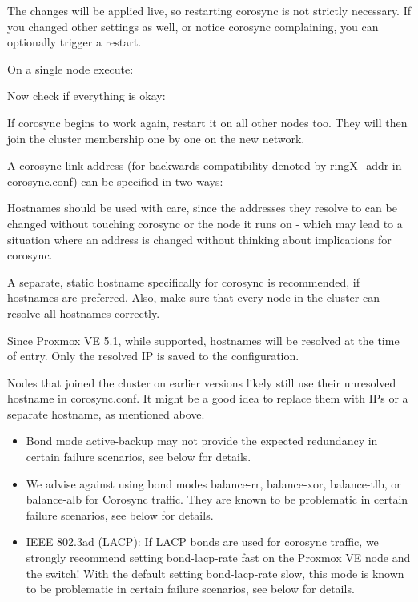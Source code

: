 The changes will be applied live, so restarting corosync is not strictly necessary. If you changed other settings as well, or notice corosync complaining, you can optionally trigger a restart.

On a single node execute:

Now check if everything is okay:

If corosync begins to work again, restart it on all other nodes too. They will then join the cluster membership one by one on the new network.

A corosync link address (for backwards compatibility denoted by ringX_addr in corosync.conf) can be specified in two ways:

Hostnames should be used with care, since the addresses they resolve to can be changed without touching corosync or the node it runs on - which may lead to a situation where an address is changed without thinking about implications for corosync.

A separate, static hostname specifically for corosync is recommended, if hostnames are preferred. Also, make sure that every node in the cluster can resolve all hostnames correctly.

Since Proxmox VE 5.1, while supported, hostnames will be resolved at the time of entry. Only the resolved IP is saved to the configuration.

Nodes that joined the cluster on earlier versions likely still use their unresolved hostname in corosync.conf. It might be a good idea to replace them with IPs or a separate hostname, as mentioned above.

\begin{itemize}[leftmargin=2cm]

	\item Bond mode active-backup may not provide the expected redundancy in certain failure scenarios, see below for details.

	\item We advise against using bond modes balance-rr, balance-xor, balance-tlb, or balance-alb for Corosync traffic. They are known to be problematic in certain failure scenarios, see below for details.

	\item IEEE 802.3ad (LACP): If LACP bonds are used for corosync traffic, we strongly recommend setting bond-lacp-rate fast on the Proxmox VE node and the switch! With the default setting bond-lacp-rate slow, this mode is known to be problematic in certain failure scenarios, see below for details.

\end{itemize}

